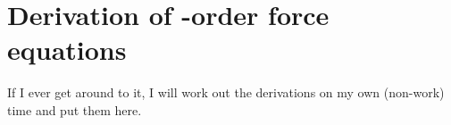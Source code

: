 \chapter{Derivation of -order force equations}
\label{app:2ndOrdDeriv}

If I ever get around to it, I will work out the derivations on my own (non-work) time and put them here.
